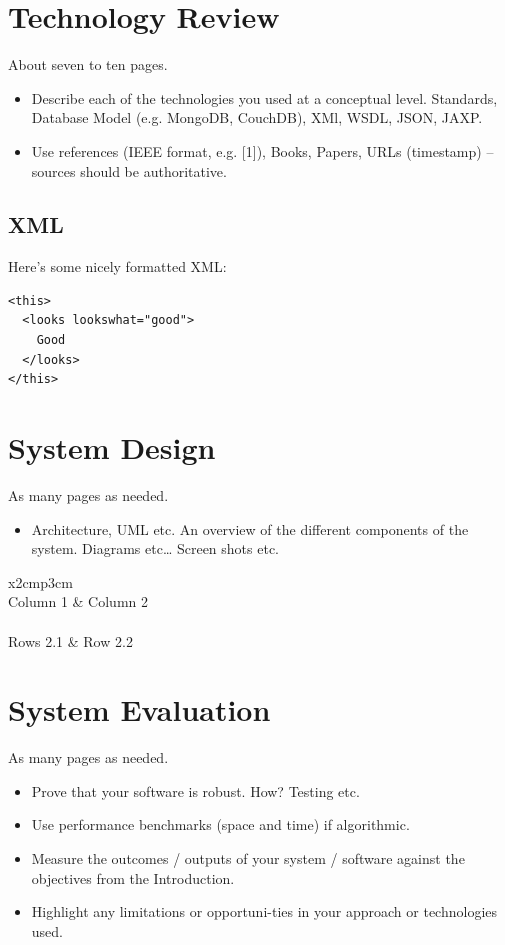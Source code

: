 \chapter{Technology Review}
About seven to ten pages.
\begin{itemize}
\item Describe each of the technologies you used at a conceptual level. Standards, Database Model (e.g. MongoDB, CouchDB), XMl, WSDL, JSON, JAXP.
\item Use references (IEEE format, e.g. [1]), Books, Papers, URLs (timestamp) – sources should be authoritative.
\end{itemize}

\section{XML}
Here's some nicely formatted XML:
\begin{verbatim}
<this>
  <looks lookswhat="good">
    Good
  </looks>
</this>
\end{verbatim}

\chapter{System Design}
As many pages as needed.
\begin{itemize}
\item Architecture, UML etc. An overview of the different components of the system. Diagrams etc… Screen shots etc.
\end{itemize}

\begin{table}[h]
  \centering
  \begin{tabular}{x{2cm}p{3cm}}
    \toprule \\
    Column 1 & Column 2 \\
    \midrule \\
    Rows 2.1 & Row 2.2 \\
    \bottomrule
  \end{tabular}
  \caption{A table.}
  \label{table:mytable}
\end{table}

\chapter{System Evaluation}
As many pages as needed.
\begin{itemize}
\item Prove that your software is robust. How? Testing etc.
\item Use performance benchmarks (space and time) if algorithmic.
\item Measure the outcomes / outputs of your system / software against the objectives from the Introduction.
\item Highlight any limitations or opportuni-ties in your approach or technologies used.
\end{itemize}

